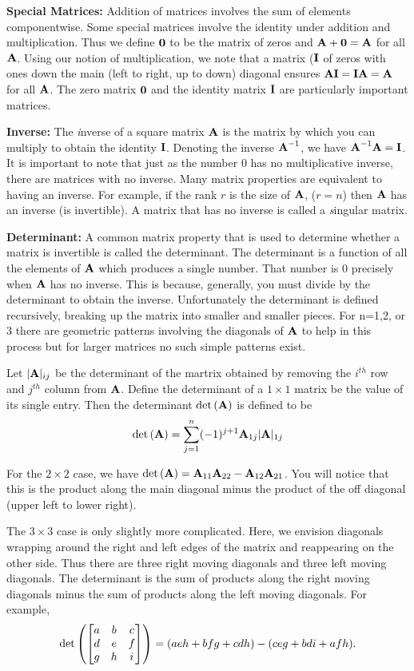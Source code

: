 \medskip
\noindent
{\bf Special Matrices:} 
Addition of matrices involves the sum of elements componentwise.
Some special matrices involve the identity under addition and multiplication.
Thus we define ${\textbf{0}}$ to be the matrix of zeros and ${\textbf{A}}+{\textbf{0}}={\textbf{A}}$ for all ${\textbf{A}}$.
Using our notion of multiplication, we note that a matrix (${\textbf{I}}$ of zeros with ones down
the main (left to right, up to down) diagonal ensures ${\textbf{A}}{\textbf{I}}={\textbf{I}}{\textbf{A}}={\textbf{A}}$ for all ${\textbf{A}}$.
The zero matrix ${\textbf{0}}$ and the identity matrix ${\textbf{I}}$ are particularly important matrices.

\medskip
\noindent
{\bf Inverse:}
The {\emph inverse} of a square matrix ${\textbf{A}}$ is the matrix by which you can multiply to
obtain the identity ${\textbf{I}}$.  Denoting the inverse ${\textbf{A}}^{-1}$, we have ${\textbf{A}}^{-1}{\textbf{A}}={\textbf{I}}$.
It is important to note that just as the number $0$ has no multiplicative inverse, there
are matrices with no inverse.  Many matrix properties are equivalent to having an inverse.
For example, if the rank $r$ is the size of ${\textbf{A}}$, ($r=n$) then ${\textbf{A}}$ has an inverse (is invertible).
A matrix that has no inverse is called a {\emph singular} matrix.

\medskip
\noindent
{\bf Determinant:}
A common matrix property that is used to determine whether a matrix is invertible
is called the determinant.  The determinant is a function of all the elements of ${\textbf{A}}$
which produces a single number.  That number is $0$ precisely when ${\textbf{A}}$ has no inverse.
This is because, generally, you must divide by the determinant to obtain the inverse.
Unfortunately the determinant is defined recursively, breaking up the matrix into smaller
and smaller pieces.  For n=1,2, or 3 there are geometric patterns involving the diagonals 
of ${\textbf{A}}$ to help in this process but for larger matrices no such simple patterns exist.

Let $|{\textbf{A}}|_{ij}$ be the determinant of the martrix obtained by removing 
the $i^{th}$ row and $j^{th}$ column from ${\textbf{A}}$.  Define the determinant of a $1\times 1$
matrix be the value of its single entry.  Then the determinant $\det{\left( {{\textbf{A}}} \right)}$ is defined
to be 
\[
  \det{\left( {{\textbf{A}}} \right)} = \sum_{j=1}^{n} (-1)^{j+1} {\textbf{A}}_{1j}|{\textbf{A}}|_{1j}
\]

For the $2\times 2$ case, we have $\det{\left( {{\textbf{A}}} \right)} = {\textbf{A}}_{11} {\textbf{A}}_{22} - {\textbf{A}}_{12}{\textbf{A}}_{21}$.
You will notice that this is the product along the main diagonal minus the product
of the off diagonal (upper left to lower right).

The $3\times 3$ case is only slightly more complicated.  Here, we envision diagonals
wrapping around the right and left edges of the matrix and reappearing on the other side.
Thus there are three right moving diagonals and three left moving diagonals.  The determinant
is the sum of products along the right moving diagonals minus the sum of products along the 
left moving diagonals.  For example,
\[
  \det{\left( {\begin{bmatrix} a & b & c \\ d & e & f \\ g & h & i \end{bmatrix}} \right)}=
  (aeh+bfg+cdh)-(ceg+bdi+afh).
\]

